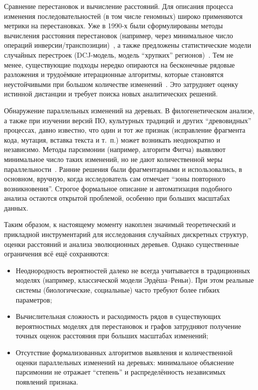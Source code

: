 Сравнение перестановок и вычисление расстояний.
Для описания процесса изменения последовательностей (в том числе геномных) широко применяются метрики на перестановках.
Уже в 1990-х были сформулированы методы вычисления расстояния перестановок (например, через минимальное число операций инверсии/транспозиции)~\cite{yancopoulos2005,braga2010}, а также предложены статистические модели случайных перестроек (DCJ-модель, модель ``хрупких'' регионов)~\cite{Pevzner03,tannier2016}.
Тем не менее, существующие подходы нередко опираются на бесконечные рядовые разложения и трудоёмкие итерационные алгоритмы, которые становятся неустойчивыми при большом количестве изменений~\cite{tannier2016}.
Это затрудняет оценку истинной дистанции и требует поиска новых аналитических решений.  

Обнаружение параллельных изменений на деревьях.
В филогенетическом анализе, а также при изучении версий ПО, культурных традиций и других ``древовидных'' процессах, давно известно, что один и тот же признак (исправление фрагмента кода, мутация, вставка текста и т.~п.) может возникать неоднократно и независимо.  
Методы парсимонии (например, алгоритм Фитча) выявляют минимальное число таких изменений, но не дают количественной меры параллельности~\cite{Avdeyev2016}.
Ранние решения были фрагментарными и использовались, в основном, вручную, когда исследователь сам отмечает ``зоны повторного возникновения''. 
Строгое формальное описание и автоматизация подобного анализа остаются открытой проблемой, особенно при больших масштабах данных.  

Таким образом, к настоящему моменту накоплен значимый теоретический и прикладной инструментарий для исследования случайных дискретных структур, оценки расстояний и анализа эволюционных деревьев.  
Однако существенные ограничения всё ещё сохраняются:

\begin{itemize}
    \item Неоднородность вероятностей далеко не всегда учитывается в традиционных моделях (например, классической модели Эрдёша--Реньи). При этом реальные системы (биологические, социальные) часто требуют более гибких параметров;  
    \item Вычислительная сложность и расходимость рядов в существующих вероятностных моделях для перестановок и графов затрудняют получение точных оценок расстояния при больших масштабах изменений;  
    \item Отсутствие формализованных алгоритмов выявления и количественной оценки параллельных изменений на деревьях: минимальное объяснение парсимонии не отражает ``степень'' и распределённость независимых появлений признака.  
\end{itemize}


